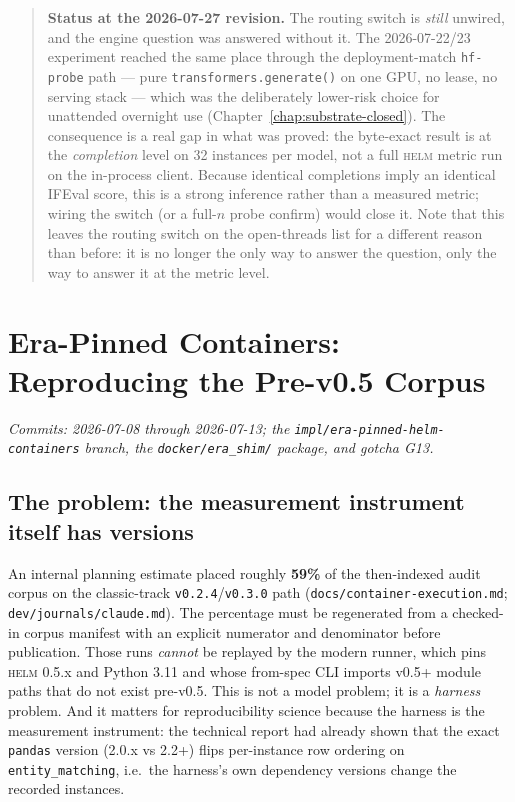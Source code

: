 \documentclass[11pt]{report}
\newcommand{\code}[1]{\texttt{#1}}
\newcommand{\file}[1]{\texttt{#1}}
\newcommand{\evidencebox}[2]{\begin{quote}\noindent\textbf{#1.} #2\end{quote}}
\begin{document}
\evidencebox{Status at the 2026-07-27 revision}{The routing switch is \emph{still}
unwired, and the engine question was answered without it. The
2026-07-22/23 experiment reached the same place through the deployment-match
\code{hf-probe} path --- pure \code{transformers.generate()} on one GPU, no lease,
no serving stack --- which was the deliberately lower-risk choice for unattended
overnight use (Chapter~\ref{chap:substrate-closed}). The consequence is a real gap
in what was proved: the byte-exact result is at the \emph{completion} level on 32
instances per model, not a full \textsc{helm} metric run on the in-process client.
Because identical completions imply an identical IFEval score, this is a strong
inference rather than a measured metric; wiring the switch (or a full-$n$ probe
confirm) would close it. Note that this leaves the routing switch on the open-threads
list for a different reason than before: it is no longer the only way to answer the
question, only the way to answer it at the metric level.}

\chapter{Era-Pinned Containers: Reproducing the Pre-v0.5 Corpus}
\label{chap:eras}

\emph{Commits: 2026-07-08 through 2026-07-13; the
\code{impl/era-pinned-helm-containers} branch, the \code{docker/era\_shim/}
package, and gotcha G13.}

\section{The problem: the measurement instrument itself has versions}

An internal planning estimate placed roughly \textbf{59\%} of the then-indexed
audit corpus on the classic-track \code{v0.2.4}/\code{v0.3.0} path
(\file{docs/container-execution.md}; \file{dev/journals/claude.md}). The percentage
must be regenerated from a checked-in corpus manifest with an explicit numerator and
denominator before publication. Those runs \emph{cannot} be replayed by the modern
runner, which pins \textsc{helm} 0.5.x and Python 3.11 and whose from-spec CLI
imports v0.5+ module paths that do not exist pre-v0.5. This is not a model problem;
it is a \emph{harness} problem. And it matters for reproducibility science because
the harness is the measurement instrument: the technical report had already shown
that the exact \code{pandas} version (2.0.x vs 2.2+) flips per-instance row
ordering on \code{entity\_matching}, i.e.\ the harness's own dependency versions
change the recorded instances.
\end{document}
